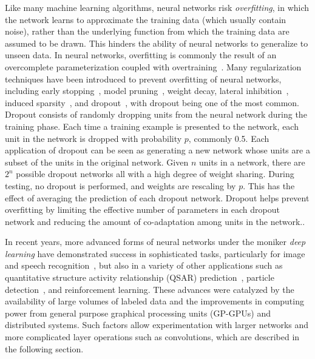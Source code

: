 Like many machine learning algorithms, neural networks risk \textit{overfitting}, in which the network learns to approximate the training data (which usually contain noise), rather than the underlying function from which the training data are assumed to be drawn.
This hinders the ability of neural networks to generalize to unseen data.
In neural networks, overfitting is commonly the result of an overcomplete parameterization coupled with overtraining~\cite{reed1993, dalianis1993}.
Many regularization techniques have been introduced to prevent overfitting of neural networks, including early stopping~\cite{morgan1990}, model pruning~\cite{reed1993}, weight decay\cite{krogh1992}, lateral inhibition~\cite{krizhevsky2012}, induced sparsity~\cite{ng2011, makhzani2015}, and dropout~\cite{srivastava2014}, with dropout being one of the most common. 
Dropout consists of randomly dropping units from the neural network during the training phase.
Each time a training example is presented to the network, each unit in the network is dropped with probability $p$, commonly 0.5.
Each application of dropout can be seen as generating a new network whose units are a subset of the units in the original network.
Given $n$ units in a network, there are $2^n$ possible dropout networks all with a high degree of weight sharing.
During testing, no dropout is performed, and weights are rescaling by $p$.
This has the effect of averaging the prediction of each dropout network.
Dropout helps prevent overfitting by limiting the effective number of parameters in each dropout network and reducing the amount of co-adaptation among units in the network.\cite{srivastava2014}.


In recent years, more advanced forms of neural networks under the moniker \textit{deep learning} have demonstrated success in sophisticated tasks, particularly for image and speech recognition~\cite{krizhevsky2012, lecun2015, masci2011, hinton2012, he2016}, but also in a variety of other applications such as quantitative structure activity relationship (QSAR) prediction~\cite{ma2015}, particle detection~\cite{ciodaro2012}, and reinforcement learning\cite{mnih2015}.
These advances were catalyzed by the availability of large volumes of labeled data\cite{deng2009, krizhevsky2009} and the improvements in computing power from general purpose graphical processing units (GP-GPUs) and distributed systems\cite{chetlur2014, chu2007}.
Such factors allow experimentation with larger networks and more complicated layer operations such as convolutions, which are described in the following section.

